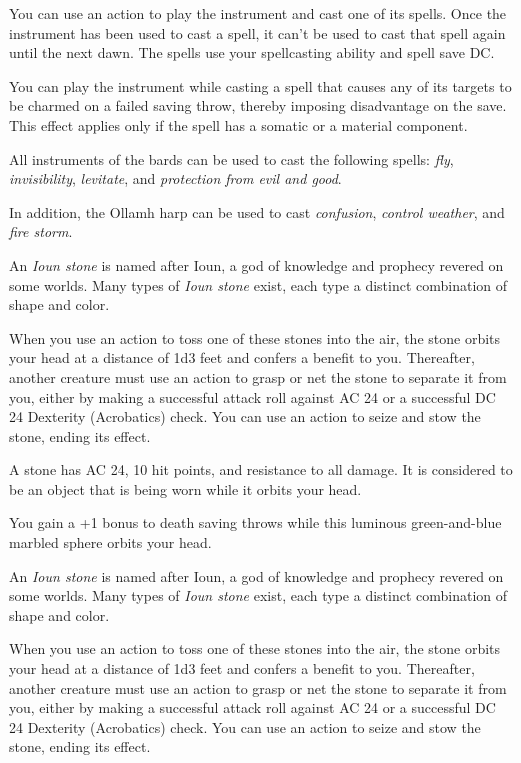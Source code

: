 \documentclass[10pt,a4paper,twoside,bg=print,twocolumn,openany,nodeprecatedcode]{dndbook}
\begin{document}
You can use an action to play the instrument and cast one of its spells. Once the instrument has been used to cast a spell, it can't be used to cast that spell again until the next dawn. The spells use your spellcasting ability and spell save DC.

You can play the instrument while casting a spell that causes any of its targets to be charmed on a failed saving throw, thereby imposing disadvantage on the save. This effect applies only if the spell has a somatic or a material component.

All instruments of the bards can be used to cast the following spells: \textit{fly}, \textit{invisibility}, \textit{levitate}, and \textit{protection from evil and good}.

In addition, the Ollamh harp can be used to cast \textit{confusion}, \textit{control weather}, and \textit{fire storm}.

An \textit{Ioun stone} is named after Ioun, a god of knowledge and prophecy revered on some worlds. Many types of \textit{Ioun stone} exist, each type a distinct combination of shape and color.

When you use an action to toss one of these stones into the air, the stone orbits your head at a distance of 1d3 feet and confers a benefit to you. Thereafter, another creature must use an action to grasp or net the stone to separate it from you, either by making a successful attack roll against AC 24 or a successful DC 24 Dexterity (Acrobatics) check. You can use an action to seize and stow the stone, ending its effect.

A stone has AC 24, 10 hit points, and resistance to all damage. It is considered to be an object that is being worn while it orbits your head.

You gain a +1 bonus to death saving throws while this luminous green-and-blue marbled sphere orbits your head.

An \textit{Ioun stone} is named after Ioun, a god of knowledge and prophecy revered on some worlds. Many types of \textit{Ioun stone} exist, each type a distinct combination of shape and color.

When you use an action to toss one of these stones into the air, the stone orbits your head at a distance of 1d3 feet and confers a benefit to you. Thereafter, another creature must use an action to grasp or net the stone to separate it from you, either by making a successful attack roll against AC 24 or a successful DC 24 Dexterity (Acrobatics) check. You can use an action to seize and stow the stone, ending its effect.
\end{document}
